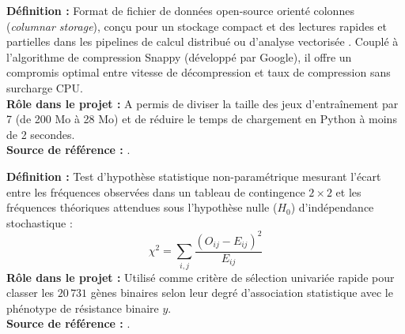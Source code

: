 \documentclass[11pt,a4paper]{article}
\begin{document}
\begin{defbox}
\textbf{Définition :} Format de fichier de données open-source orienté colonnes (\textit{columnar storage}), conçu pour un stockage compact et des lectures rapides et partielles dans les pipelines de calcul distribué ou d'analyse vectorisée \citep{vohra2016apache}. Couplé à l'algorithme de compression Snappy (développé par Google), il offre un compromis optimal entre vitesse de décompression et taux de compression sans surcharge CPU.\\
\textbf{Rôle dans le projet :} A permis de diviser la taille des jeux d'entraînement par 7 (de 200 Mo à 28 Mo) et de réduire le temps de chargement en Python à moins de 2 secondes.\\
\textbf{Source de référence :} \citet{vohra2016apache}.
\end{defbox}

\begin{defbox}
\textbf{Définition :} Test d'hypothèse statistique non-paramétrique mesurant l'écart entre les fréquences observées dans un tableau de contingence $2 \times 2$ et les fréquences théoriques attendues sous l'hypothèse nulle ($H_0$) d'indépendance stochastique \citep{agresti2013categorical} :
\[
\chi^2 = \sum_{i,j} \frac{(O_{ij} - E_{ij})^2}{E_{ij}}
\]
\textbf{Rôle dans le projet :} Utilisé comme critère de sélection univariée rapide pour classer les $20\,731$ gènes binaires selon leur degré d'association statistique avec le phénotype de résistance binaire $y$.\\
\textbf{Source de référence :} \citet{agresti2013categorical}.
\end{defbox}
\end{document}

